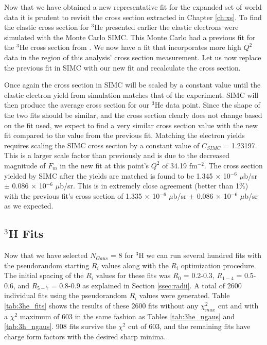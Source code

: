 Now that we have obtained a new representative fit for the expanded set of world data it is prudent to revisit the cross section extracted in Chapter \ref{ch:xs}. To find the elastic cross section for $^3$He presented earlier the elastic electrons were simulated with the Monte Carlo SIMC. This Monte Carlo had a previous fit for the $^3$He cross section from \cite{Article:Amroun}. We now have a fit that incorporates more high $Q^2$ data in the region of this analysis' cross section measurement. Let us now replace the previous fit in SIMC with our new fit and recalculate the cross section.

Once again the cross section in SIMC will be scaled by a constant value until the elastic electron yield from simulation matches that of the experiment. SIMC will then produce the average cross section for our $^3$He data point. Since the shape of the two fits should be similar, and the cross section clearly does not change based on the fit used, we expect to find a very similar cross section value with the new fit compared to the value from the previous fit. Matching the electron yields requires scaling the SIMC cross section by a constant value of $C_{SIMC}$ = 1.23197. This is a larger scale factor than previously and is due to the decreased magnitude of $F_m$ in the new fit at this point's $Q^2$ of 34.19 fm$^{-2}$. The cross section yielded by SIMC after the yields are matched is found to be 1.345 $\times$ 10$^{-6}$ $\mu$b/sr $\pm$ 0.086 $\times$ 10$^{-6}$ $\mu$b/sr. This is in extremely close agreement (better than 1$\%$) with the previous fit's cross section of 1.335 $\times$ 10$^{-6}$ $\mu$b/sr $\pm$ 0.086 $\times$ 10$^{-6}$ $\mu$b/sr as we expected.

\subsection{$^3$H Fits}
\label{ssec:3h_fits}

Now that we have selected $N_{Gaus}$ = 8 for $^3$H we can run several hundred fits with the pseudorandom starting $R_i$ values along with the $R_i$ optimization procedure. The initial spacing of the $R_i$ values for these fits was $R_0$ = 0.2-0.3, $R_{1-4}$ = 0.5-0.6, and $R_{5-7}$ = 0.8-0.9 as explained in Section \ref{ssec:radii}. A total of 2600 individual fits using the pseudorandom $R_i$ values were generated. Table \ref{tab:3he_fits} shows the results of these 2600 fits without any $\chi^2_{max}$ cut and with a $\chi^2$ maximum of 603 in the same fashion as Tables \ref{tab:3he_ngaus} and \ref{tab:3h_ngaus}. 908 fits survive the $\chi^2$ cut of 603, and the remaining fits have charge form factors with the desired sharp minima.

